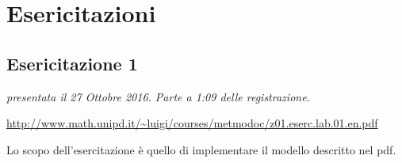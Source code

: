 
\chapter{Esericitazioni}

\section{Esericitazione 1}

\begin{center}
	\textit{presentata il 27 Ottobre 2016. Parte a 1:09 delle registrazione.}
	
	\url{http://www.math.unipd.it/~luigi/courses/metmodoc/z01.eserc.lab.01.en.pdf}
\end{center}

\noindent Lo scopo dell'esercitazione è quello di implementare il modello descritto nel pdf.